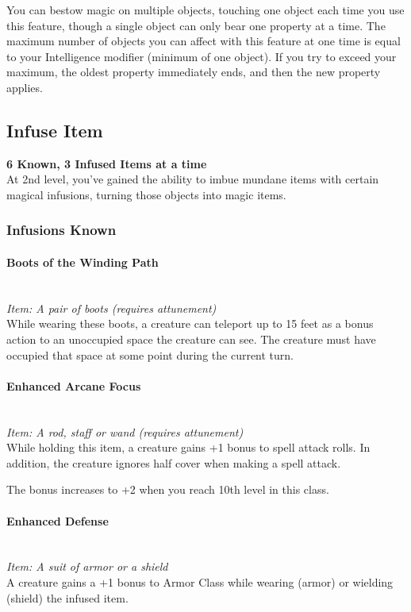 \documentclass[letterpaper,openany,oneside,twocolumn]{book}
\begin{document}
You can bestow magic on multiple objects, touching one object each time you use this feature, though a single object can only bear one property at a time. The maximum number of objects you can affect with this feature at one time is equal to your Intelligence modifier (minimum of one object). If you try to exceed your maximum, the oldest property immediately ends, and then the new property applies.
\subsection*{Infuse Item}
\textbf{6 Known, 3 Infused Items at a time}\\
At 2nd level, you've gained the ability to imbue mundane items with certain magical infusions, turning those objects into magic items.
\subsubsection*{Infusions Known}
\paragraph*{Boots of the Winding Path}\hfill\\
\textit{Item: A pair of boots (requires attunement)}\\
While wearing these boots, a creature can teleport up to 15 feet as a bonus action to an unoccupied space the creature can see. The creature must have occupied that space at some point during the current turn.
\paragraph*{Enhanced Arcane Focus}\hfill\\
\textit{Item: A rod, staff or wand (requires attunement)}\\
While holding this item, a creature gains +1 bonus to spell attack rolls. In addition, the creature ignores half cover when making a spell attack.

The bonus increases to +2 when you reach 10th level in this class.
\paragraph*{Enhanced Defense}\hfill\\
\textit{Item: A suit of armor or a shield}\\
A creature gains a +1 bonus to Armor Class while wearing (armor) or wielding (shield) the infused item.
\end{document}
